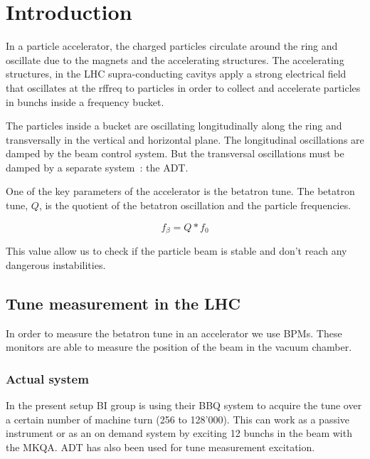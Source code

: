 %

\chapter{Introduction}

In a particle accelerator, the charged particles circulate around the ring
and oscillate due to the magnets and the accelerating structures. The 
accelerating structures, in the \gls{LHC} supra-conducting \glspl{cavity} 
apply a strong electrical field that oscillates at the \gls{rffreq} 
to particles in order to collect and accelerate particles in \glspl{bunch} 
inside a frequency \gls{bucket}.

The particles inside a bucket are oscillating longitudinally along the 
ring and transversally in the vertical and horizontal plane. The longitudinal
oscillations are damped by the beam control system. But the transversal
oscillations must be damped by a separate system~: the 
\gls{ADT}\cite{Benews11,Zhabitsky:1141925}.

One of the key parameters of the accelerator is the betatron tune. The 
betatron tune, $Q$, is the quotient of the betatron oscillation and the 
particle frequencies.

$$f_\beta = Q * f_0$$

This value allow us to check if the particle beam is stable and don't reach
any dangerous instabilities.

\section{Tune measurement in the LHC}

In order to measure the betatron tune in an accelerator we use \glspl{BPM}.
These monitors are able to measure the position of the beam in the vacuum 
chamber.

\subsection{Actual system}

In the present setup \gls{BI} group is using their \gls{BBQ} 
\cite{Boccardi:1156349} system to acquire the tune over a certain number
of machine turn (256 to 128'000). This can work as a passive instrument or as 
an on demand system by exciting 12 \glspl{bunch} in the beam with the 
\gls{MKQA}. \Gls{ADT} has also been used for tune measurement 
excitation\cite{HofleEvian10}. 

